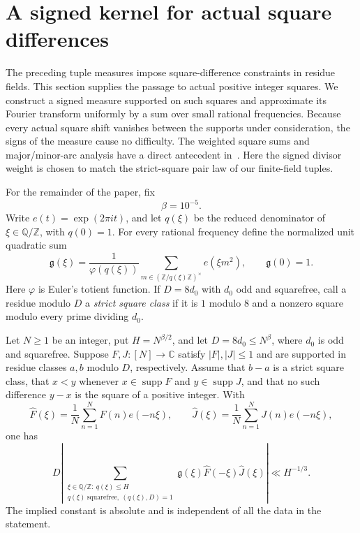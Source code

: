\section{A signed kernel for actual square differences}
\label{sec:square-kernel}

The preceding tuple measures impose square-difference constraints in residue fields.
This section supplies the passage to actual positive integer squares.
We construct a signed measure supported on such squares and approximate
its Fourier transform uniformly by a sum over small rational frequencies.
Because every actual square shift vanishes between the supports under
consideration, the signs of the measure cause no difficulty. The weighted
square sums and major/minor-arc analysis have a direct antecedent
in~\cite[Section~5]{GreenSawhney2025}. Here the signed divisor weight
is chosen to match the strict-square pair law of our finite-field tuples.

For the remainder of the paper, fix
\begin{equation}
 \beta=10^{-5}.
 \label{eq:kernel-beta}
\end{equation}
Write $e(t)=\exp(2\pi i t)$, and let $q(\xi)$ be the reduced denominator
of $\xi\in\mathbb Q/\mathbb Z$, with $q(0)=1$.
For every rational frequency define the normalized unit quadratic sum
\begin{equation}
 \mathfrak g(\xi)
 =\frac{1}{\varphi(q(\xi))}
   \sum_{m\in(\mathbb Z/q(\xi)\mathbb Z)^\times}e(\xi m^2),
 \qquad \mathfrak g(0)=1.
 \label{eq:kernel-unit-gauss}
\end{equation}
Here $\varphi$ is Euler's totient function.
If $D=8d_0$ with $d_0$ odd and squarefree, call a residue modulo $D$
a \emph{strict square class} if it is $1$ modulo $8$ and a nonzero
square modulo every prime dividing $d_0$.

\begin{proposition}
\label{prop:square-kernel}
Let $N\ge1$ be an integer, put $H=N^{\beta/2}$, and let
$D=8d_0\le N^\beta$, where $d_0$ is odd and squarefree.
Suppose $F,J:[N]\to\mathbb C$ satisfy $|F|,|J|\le1$ and are supported
in residue classes $a,b$ modulo $D$, respectively. Assume that $b-a$
is a strict square class, that $x<y$ whenever
$x\in\operatorname{supp}F$ and $y\in\operatorname{supp}J$, and that
no such difference $y-x$ is the square of a positive integer.
With
\[
 \widehat F(\xi)=\frac1N\sum_{n=1}^N F(n)e(-n\xi),
 \qquad
 \widehat J(\xi)=\frac1N\sum_{n=1}^N J(n)e(-n\xi),
\]
one has
\begin{equation}
 D\left|
 \sum_{\substack{\xi\in\mathbb Q/\mathbb Z:\ q(\xi)\le H\\
                  q(\xi)\ \mathrm{squarefree},\ (q(\xi),D)=1}}
      \mathfrak g(\xi)\widehat F(-\xi)\widehat J(\xi)
 \right|
 \ll H^{-1/3}.
 \label{eq:kernel-conclusion}
\end{equation}
The implied constant is absolute and is independent of all the data
in the statement.
\end{proposition}

